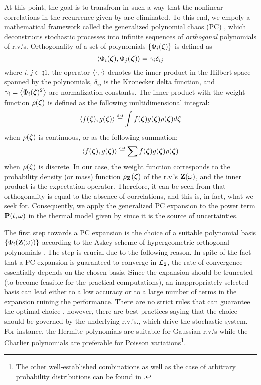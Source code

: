 At this point, the goal is to transfrom  in such a way that the nonlinear correlations in the recurrence given by  are eliminated. To this end, we empoly a mathematical framework called the generalized polynomial chaos (PC) \cite{xiu2002}, which deconstructs stochastic processes into infinite sequences of \emph{orthogonal} polynomials of r.v.'s. Orthogonality of a set of polynomials $\{ \Phi_i(\boldsymbol{\zeta}) \}$ is defined as
\begin{equation} \elabel{orthogonality}
  \oInner{\pcb_i(\vz)}{\pcb_j(\vz)} = \pcn_i \delta_{ij}
\end{equation}
where $i,j \in \natural{1}$, the operator $\oInner{\cd}{\cd}$ denotes the inner product in the Hilbert space spanned by the polynomials, $\delta_{ij}$ is the Kronecker delta function, and $\pcn_i = \oInner{\pcb_i(\vz)^2}$ are normalization constants. The inner product with the weight function $\rho(\boldsymbol{\zeta})$ is defined as the following multidimensional integral:
\begin{equation} \elabel{inner-product-integral}
  \oInner{f(\vz)}{g(\vz)} \eqdef \int f(\vz) g(\vz) \pdf(\vz) d\vz
\end{equation}
when $\rho(\boldsymbol{\zeta})$ is continuous, or as the following summation:
\begin{equation} \elabel{inner-product-sum}
  \oInner{f(\vz)}{g(\vz)} \eqdef \sum f(\vz) g(\vz) \pdf(\vz)
\end{equation}
when $\rho(\boldsymbol{\zeta})$ is discrete. In our case, the weight function corresponds to the probability density (or mass) function $\rho_{\mathbf{Z}}(\boldsymbol{\zeta})$ of the r.v.'s $\mathbf{Z}(\omega)$, and the inner product is the expectation operator. Therefore, it can be seen from  that orthogonality is equal to the absence of correlations, and this is, in fact, what we seek for. Consequently, we apply the generalized PC expansion to the power term $\mathbf{P}(t, \omega)$ in the thermal model given by  since it is the source of uncertainties.

The first step towards a PC expansion is the choice of a suitable polynomial basis $\{ \Phi_i(\mathbf{Z}(\omega)) \}$ according to the Askey scheme of hypergeometric orthogonal polynomials \cite{xiu2002}. The step is crucial due to the following reason. In spite of the fact that a PC expansion is guaranteed to converge in $\mathcal{L}_{2}$, the rate of convergence essentially depends on the chosen basis. Since the expansion should be truncated (to become feasible for the practical computations), an inappropriately selected basis can lead either to a low accuracy or to a large number of terms in the expansion ruining the performance. There are no strict rules that can guarantee the optimal choice \cite{knio2006, maitre2010}, however, there are best practices saying that the choice should be governed by the underlying r.v.'s., which drive the stochastic system. For instance, the Hermite polynomials are suitable for Gaussian r.v.'s while the Charlier polynomials are preferable for Poisson variations\footnote{The other well-established combinations as well as the case of arbitrary probability distributions can be found in \cite{xiu2002}.}.


